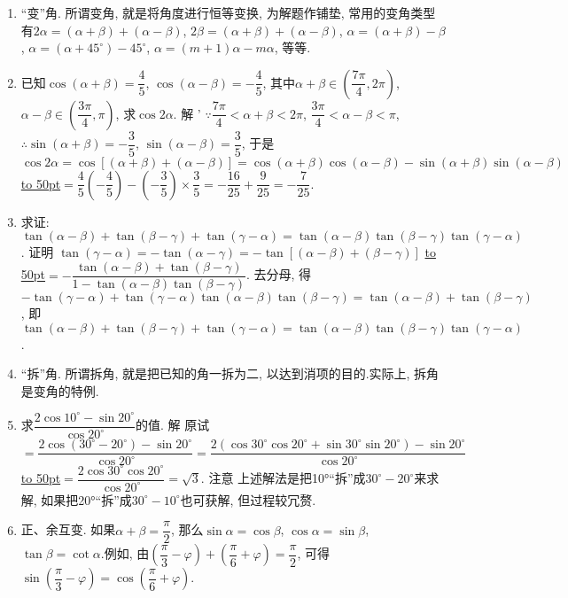 \documentclass[10pt,a4paper]{article}
\newcommand{\blank}[1]{\underline{\hbox to #1pt{}}}
\begin{document}
\begin{enumerate}[1.]



\item ``变''角.
所谓变角, 就是将角度进行恒等变换, 为解题作铺垫, 常用的变角类型有$2\alpha =(\alpha +\beta)+(\alpha -\beta)$, $2\beta =(\alpha +\beta)+(\alpha -\beta)$, $\alpha =(\alpha +\beta)-\beta$, $\alpha =(\alpha +45^\circ)-45^\circ$, $\alpha =(m+1)\alpha -m\alpha$, 等等.
\item 已知$\cos (\alpha +\beta)=\dfrac 45$, $\cos (\alpha -\beta)=-\dfrac 45$, 其中$\alpha +\beta \in (\dfrac{7\pi }4,2\pi)$, $\alpha -\beta \in (\dfrac{3\pi }4,\pi)$, 求$\cos 2\alpha$.
解  ' $\because \dfrac{7\pi }4<\alpha +\beta <2\pi$, $\dfrac{3\pi }4<\alpha -\beta <\pi$, $\therefore \sin (\alpha +\beta)=-\dfrac 35$, $\sin (\alpha -\beta)=\dfrac 35$,
于是$\cos 2\alpha =\cos [(\alpha +\beta)+(\alpha -\beta)]=\cos (\alpha +\beta)\cos (\alpha -\beta)-\sin (\alpha +\beta)\sin (\alpha -\beta)$
\blank{50}$=\dfrac 45(-\dfrac 45)-(-\dfrac 35)\times \dfrac 35=-\dfrac{16}{25}+\dfrac 9{25}=-\dfrac 7{25}$.
\item 求证: $\tan (\alpha -\beta)+\tan (\beta -\gamma)+\tan (\gamma -\alpha)=\tan (\alpha -\beta)\tan (\beta -\gamma)\tan (\gamma -\alpha)$.
证明  $\tan (\gamma -\alpha)=-\tan (\alpha -\gamma)=-\tan [(\alpha -\beta)+(\beta -\gamma)]$
\blank{50}$=-\dfrac{\tan (\alpha -\beta)+\tan (\beta -\gamma)}{1-\tan (\alpha -\beta)\tan (\beta -\gamma)}$.
去分母, 得$-\tan (\gamma -\alpha)+\tan (\gamma -\alpha)\tan (\alpha -\beta)\tan (\beta -\gamma)=\tan (\alpha -\beta)+\tan (\beta -\gamma)$,
即$\tan (\alpha -\beta)+\tan (\beta -\gamma)+\tan (\gamma -\alpha)=\tan (\alpha -\beta)\tan (\beta -\gamma)\tan (\gamma -\alpha)$.
\item ``拆''角.
所谓拆角, 就是把已知的角一拆为二, 以达到消项的目的.实际上, 拆角是变角的特例.
\item 求$\dfrac{2\cos 10^\circ -\sin 20^\circ }{\cos 20^\circ }$的值.
解  原试$=\dfrac{2\cos (30^\circ -20^\circ)-\sin 20^\circ }{\cos 20^\circ }=\dfrac{2(\cos 30^\circ \cos 20^\circ +\sin 30^\circ \sin 20^\circ)-\sin 20^\circ }{\cos 20^\circ }$
\blank{50}$=\dfrac{2\cos 30^\circ \cos 20^\circ }{\cos 20^\circ }=\sqrt 3$.
注意  上述解法是把10°``拆''成$30^\circ -20^\circ$来求解, 如果把20°``拆''成$30^\circ -10^\circ$也可获解, 但过程较冗赘.
\item 正、余互变.
如果$\alpha +\beta =\dfrac{\pi }2$, 那么$\sin \alpha =\cos \beta$, $\cos \alpha =\sin \beta$, $\tan \beta =\cot \alpha$.例如, 由$(\dfrac{\pi }3-\varphi)+(\dfrac{\pi }6+\varphi)=\dfrac{\pi }2$, 可得$\sin (\dfrac{\pi }3-\varphi)=\cos (\dfrac{\pi }6+\varphi)$.

\end{enumerate}
\end{document}
